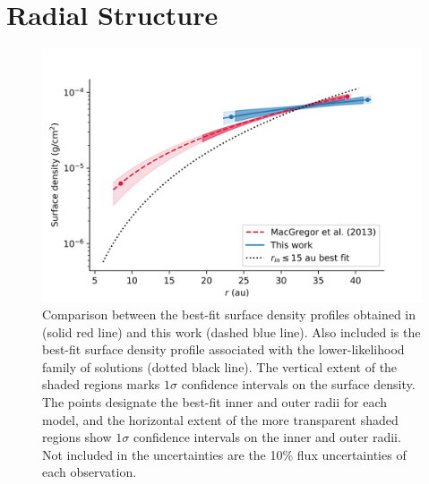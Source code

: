 \documentclass[12pt,oneside]{book}
\begin{document}
\section{Radial Structure}
\label{section: radial discussion}

\begin{figure}
  \includegraphics[width=\linewidth]{../figures/surface_density}
  \caption{
    Comparison between the best-fit surface density profiles obtained in \cite{macgregor13} (solid red line) and this work (dashed blue line).
    Also included is the best-fit surface density profile associated with the lower-likelihood family of solutions (dotted black line).
    The vertical extent of the shaded regions marks $1\sigma$ confidence intervals on the surface density. 
    The points designate the best-fit inner and outer radii for each model, and the horizontal extent of the more transparent shaded regions show $1 \sigma$ confidence intervals on the inner and outer radii.
    Not included in the uncertainties are the 10\% flux uncertainties of each observation.
    }
  \label{fig surface_density}
\end{figure}
\end{document}

